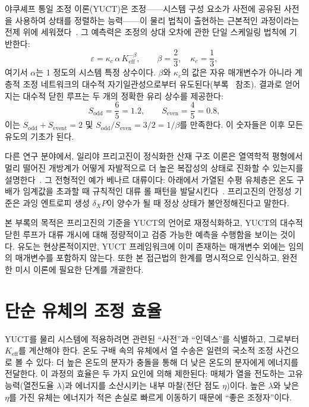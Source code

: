 \documentclass[12pt,a4paper]{article}
\begin{document}
	야쿠셰프 통일 조정 이론(YUCT)은 조정——시스템 구성 요소가 사전에 공유된 사전을 사용하여 상태를 정렬하는 능력——이 물리 법칙이 출현하는 근본적인 과정이라는 전제 위에 세워졌다~\cite{Yakushev2026}. 그 예측력은 조정의 상대 오차에 관한 단일 스케일링 법칙에 기반한다:
	\begin{equation}\label{eq:universal}
		\varepsilon = \kappa_c\,\alpha\, K_{\mathrm{eff}}^{-\beta},\qquad 
		\beta = \frac{2}{3},\quad \kappa_c = \frac{1}{3},
	\end{equation}
	여기서 \(\alpha\)는 1 정도의 시스템 특정 상수이다. \(\beta\)와 \(\kappa_c\)의 값은 자유 매개변수가 아니라 계층적 조정 네트워크의 대수적 자기일관성으로부터 유도된다(부록~\cite{AppendixY, AppendixL, AppendixFerra, AppendixAF} 참조). 결과로 얻어지는 대수적 닫힌 루프는 두 개의 정확한 유리 상수를 제공한다:
	\begin{equation}\label{eq:S-constants}
		S_{\mathrm{odd}} = \frac{6}{5} = 1.2,\qquad
		S_{\mathrm{even}} = \frac{4}{5} = 0.8,
	\end{equation}
	이는 \(S_{\mathrm{odd}} + S_{\mathrm{event}} = 2\) 및 \(S_{\mathrm{odd}}/S_{\mathrm{even}} = 3/2 = 1/\beta\)를 만족한다. 이 숫자들은 이후 모든 유도의 기초가 된다.
	
	다른 연구 분야에서, 일리야 프리고진이 정식화한 산재 구조 이론은 열역학적 평형에서 멀리 떨어진 개방계가 어떻게 자발적으로 더 높은 복잡성의 상태로 진화할 수 있는지를 설명한다~\cite{Prigogine1977, Glansdorff1971}. 그 전형적인 예가 베나르 대류이다: 아래에서 가열된 수평 유체층은 온도 구배가 임계값을 초과할 때 규칙적인 대류 롤 패턴을 발달시킨다~\cite{Chandrasekhar1961}. 프리고진의 안정성 기준은 과잉 엔트로피 생성 \(\delta_X P\)이 양수가 될 때 정상 상태가 불안정해진다고 말한다.
	
	본 부록의 목적은 프리고진의 기준을 YUCT의 언어로 재정식화하고, YUCT의 대수적 닫힌 루프가 대류 개시에 대해 정량적이고 검증 가능한 예측을 수행함을 보이는 것이다. 유도는 현상론적이지만, YUCT 프레임워크에 이미 존재하는 매개변수 외에는 임의의 매개변수를 포함하지 않는다. 또한 본 접근법의 한계를 명시적으로 인식하고, 완전한 미시 이론에 필요한 단계를 개괄한다.
	
	\section{단순 유체의 조정 효율}
	
	YUCT를 물리 시스템에 적용하려면 관련된 ``사전''과 ``인덱스''를 식별하고, 그로부터 \(K_{\mathrm{eff}}\)를 계산해야 한다. 온도 구배 속의 유체에서 열 수송은 일련의 국소적 조정 사건으로 볼 수 있다: 더 높은 온도의 분자가 충돌을 통해 더 낮은 온도의 분자에게 에너지를 전달한다. 이 과정의 효율은 두 가지 요인에 의해 제한된다: 매체가 열을 전도하는 고유 능력(열전도율 \(\lambda\))과 에너지를 소산시키는 내부 마찰(전단 점도 \(\eta\))이다. 높은 \(\lambda\)와 낮은 \(\eta\)를 가진 유체는 에너지가 적은 손실로 빠르게 이동하기 때문에 ``좋은 조정자''이다.
	
\end{document}
